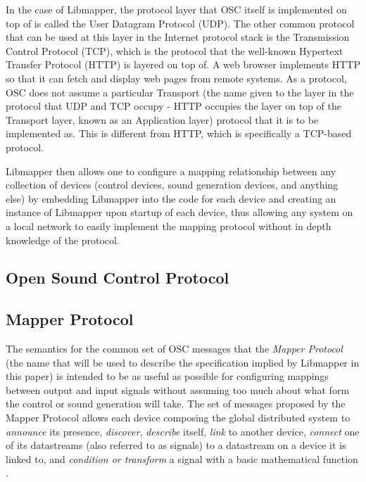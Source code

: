 In the case of Libmapper, the protocol layer that OSC itself is implemented on top of is called the User Datagram Protocol (UDP). The other common protocol that can be used at this layer in the Internet protocol stack is the Transmission Control Protocol (TCP), which is the protocol that the well-known Hypertext Transfer Protocol (HTTP) is layered on top of. A web browser implements HTTP so that it can fetch and display web pages from remote systems. As a protocol, OSC does not assume a particular Transport (the name given to the layer in the protocol that UDP and TCP occupy - HTTP occupies the layer on top of the Transport layer, known as an Application layer) protocol that it is to be implemented as. This is different from HTTP, which is specifically a TCP-based protocol.

Libmapper then allows one to configure a mapping relationship between any collection of devices (control devices, sound generation devices, and anything else) by embedding Libmapper into the code for each device and creating an instance of Libmapper upon startup of each device, thus allowing any system on a local network to easily implement the mapping protocol without in depth knowledge of the protocol.

\subsection{Open Sound Control Protocol}



\subsection{Mapper Protocol}

The semantics for the common set of OSC messages that the \emph{Mapper Protocol} (the name that will be used to describe the specification implied by Libmapper in this paper) is intended to be as useful as possible for configuring mappings between output and input signals without assuming too much about what form the control or sound generation will take. The set of messages proposed by the Mapper Protocol allows each device composing the global distributed system to \emph{announce} its presence, \emph{discover}, \emph{describe} itself, \emph{link} to another device, \emph{connect} one of its datastreams (also referred to as signals) to a datastream on a device it is linked to, and \emph{condition or transform} a signal with a basic mathematical function \cite{Malloch2009}.

